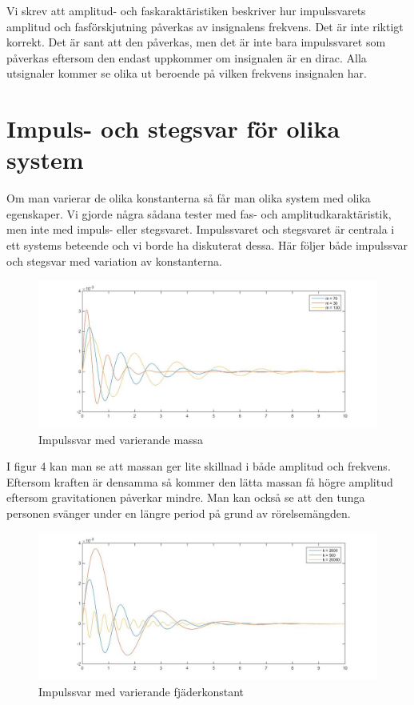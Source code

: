 \documentclass[10pt,a4paper]{article}
\begin{document}
Vi skrev att amplitud- och faskaraktäristiken beskriver hur impulssvarets amplitud och fasförskjutning påverkas av insignalens frekvens. Det är inte riktigt korrekt. Det är sant att den påverkas, men det är inte bara impulssvaret som påverkas eftersom den endast uppkommer om insignalen är en dirac. Alla utsignaler kommer se olika ut beroende på vilken frekvens insignalen har.

\section{Impuls- och stegsvar för olika system}

Om man varierar de olika konstanterna så får man olika system med olika egenskaper. Vi gjorde några sådana tester med fas- och amplitudkaraktäristik, men inte med impuls- eller stegsvaret. Impulssvaret och stegsvaret är centrala i ett systems beteende och vi borde ha diskuterat dessa. Här följer både impulssvar och stegsvar med variation av konstanterna.

\begin{figure}[h]
\begin{center}
\includegraphics[scale=0.4]{impulssvar(massa)}
\caption{Impulssvar med varierande massa}
\end{center}
\end{figure}

I figur 4 kan man se att massan ger lite skillnad i både amplitud och frekvens. Eftersom kraften är densamma så kommer den lätta massan få högre amplitud eftersom gravitationen påverkar mindre. Man kan också se att den tunga personen svänger under en längre period på grund av rörelsemängden.

\newpage
\begin{figure}[h]
\begin{center}
\includegraphics[scale=0.4]{impulssvar(fjader)}
\caption{Impulssvar med varierande fjäderkonstant}
\end{center}
\end{figure}
\end{document}
